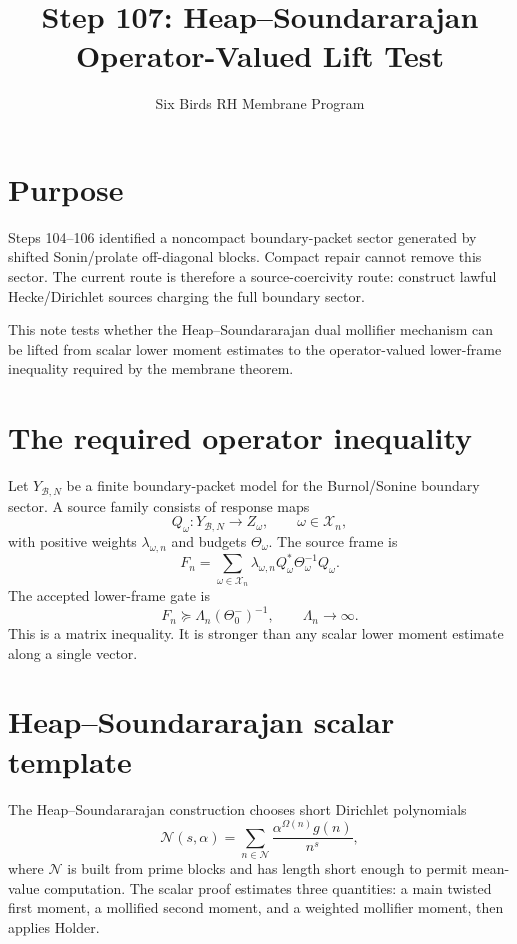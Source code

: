 \documentclass[11pt]{article}
\title{Step 107: Heap--Soundararajan Operator-Valued Lift Test}
\author{Six Birds RH Membrane Program}
\date{}
\newcommand{\cX}{\mathcal X}
\newcommand{\cB}{\mathcal B}
\begin{document}
\maketitle

\section{Purpose}
Steps 104--106 identified a noncompact boundary-packet sector generated by shifted Sonin/prolate off-diagonal blocks.  Compact repair cannot remove this sector.  The current route is therefore a source-coercivity route: construct lawful Hecke/Dirichlet sources charging the full boundary sector.

This note tests whether the Heap--Soundararajan dual mollifier mechanism can be lifted from scalar lower moment estimates to the operator-valued lower-frame inequality required by the membrane theorem.

\section{The required operator inequality}
Let $Y_{\cB,N}$ be a finite boundary-packet model for the Burnol/Sonine boundary sector.  A source family consists of response maps
\[
        Q_\omega:Y_{\cB,N}\to Z_\omega,
        \qquad \omega\in\cX_n,
\]
with positive weights $\lambda_{\omega,n}$ and budgets $\Theta_\omega$.  The source frame is
\[
        F_n=\sum_{\omega\in\cX_n}\lambda_{\omega,n}
        Q_\omega^*\Theta_\omega^{-1}Q_\omega.
\]
The accepted lower-frame gate is
\begin{equation}\label{eq:lower-frame}
        F_n\succeq \Lambda_n(\Theta_0^-)^{-1},\qquad \Lambda_n\to\infty.
\end{equation}
This is a matrix inequality.  It is stronger than any scalar lower moment estimate along a single vector.

\section{Heap--Soundararajan scalar template}
The Heap--Soundararajan construction chooses short Dirichlet polynomials
\[
        \mathcal N(s,\alpha)=\sum_{n\in\mathcal N}
        \frac{\alpha^{\Omega(n)}g(n)}{n^s},
\]
where $\mathcal N$ is built from prime blocks and has length short enough to permit mean-value computation.  The scalar proof estimates three quantities: a main twisted first moment, a mollified second moment, and a weighted mollifier moment, then applies Holder.
\end{document}
